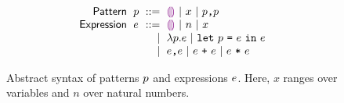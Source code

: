\begin{figure}
  \vspace{-3px}
  \[
  \arraycolsep=3pt\begin{array}{rlrl}
      \mathsf{Pattern} & \spat & ::= &
        \shole ~\vert~
        \svar{x} ~\vert~
        \sprod{\spat}{\spat}\\
      \mathsf{Expression} & \sexp & ::= &
        \shole ~\vert~
        \snumlit{n} ~\vert~
        \svar{x} \\
      & & \vert &
        \slam{\spat}{\sexp} ~\vert~
        \slet{\spat}{\sexp}{\sexp}\\
      & & \vert &
        \sprod{\sexp}{\sexp} ~\vert~
        \splus{\sexp}{\sexp} ~\vert~
        \smult{\sexp}{\sexp}
  \end{array}\]
  \caption{
    Abstract syntax of patterns $p$ and expressions $e$.
    Here,
      $x$ ranges over variables
      and $n$ over natural numbers.
  }
  \label{fig:language-syntax}
\end{figure}
